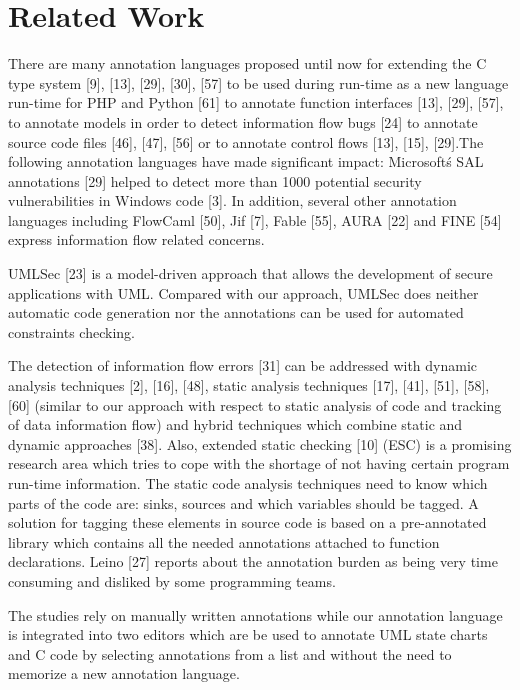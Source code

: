 \chapter{Related Work}

There are many annotation languages proposed until now for
extending the C type system [9], [13], [29], [30], [57] to be
used during run-time as a new language run-time for PHP and
Python [61] to annotate function interfaces [13], [29], [57], to
annotate models in order to detect information flow bugs [24]
to annotate source code files [46], [47], [56] or to annotate
control flows [13], [15], [29].The following annotation languages have made significant impact: Microsoft\'s SAL annotations [29] helped to detect more than 1000 potential security vulnerabilities in Windows
code [3]. In addition, several other annotation languages including FlowCaml [50], Jif [7], Fable [55], AURA [22] and FINE [54] express information flow related concerns.

UMLSec [23] is a model-driven approach that allows the
development of secure applications with UML. Compared with
our approach, UMLSec does neither automatic code
generation nor the annotations can be used for automated
constraints checking.

The detection of information flow errors [31] can be
addressed with dynamic analysis techniques [2], [16], [48],
static analysis techniques [17], [41], [51], [58], [60] (similar
to our approach with respect to static analysis of code and
tracking of data information flow) and hybrid techniques which
combine static and dynamic approaches [38]. Also, extended
static checking [10] (ESC) is a promising research area which
tries to cope with the shortage of not having certain program
run-time information.
The static code analysis techniques need to know which
parts of the code are: sinks, sources and which variables
should be tagged. A solution for tagging these elements in
source code is based on a pre-annotated library which contains
all the needed annotations attached to function declarations.
Leino [27] reports about the annotation burden as being very
time consuming and disliked by some programming teams.


 The studies rely on manually
written annotations while our annotation language is integrated
into two editors which are be used to annotate UML state
charts and C code by selecting annotations from a list and
without the need to memorize a new annotation language.

